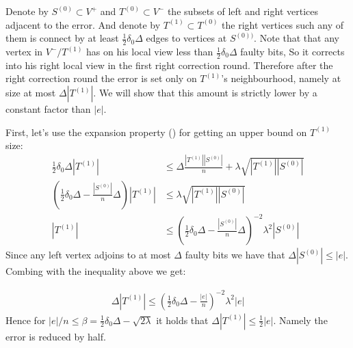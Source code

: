 \documentclass{beamer}
\begin{document}
\begin{frame}

  Denote by $S^{(0)} \subset V^{+}$ and  $T^{(0)} \subset V^{-}$ the subsets of left and right vertices adjacent to the error. And denote by $T^{(1)} \subset T^{(0)}$ the right vertices such any of them is connect by at least $\frac{1}{2}\delta_{0}\Delta$ edges to vertices at $S^{(0))}$. Note that that any vertex in $V^{-}/T^{(1)}$ has on his local view less than $\frac{1}{2}\delta_{0}\Delta$ faulty bits, So it corrects into his right local view in the first right correction round. Therefore after the right correction round the error is set only on $T^{(1)}$'s neighbourhood, namely at size at most $\Delta|T^{(1)}|$.  We will show that this amount is strictly lower by a constant factor than $|e|$. 

\end{frame}
\begin{frame}

  First, let's use the expansion property () for getting an upper bound on $T^{(1)}$ size: \begin{equation*}
  \begin{split} 
    \frac{1}{2}\delta_{0}\Delta |T^{(1)}| & \le \Delta \frac{|T^{(1)}||S^{(0)}|}{n} + \lambda\sqrt{|T^{(1)}||S^{(0)}|} \\ 
  \left( \frac{1}{2} \delta_{0} \Delta - \frac{|S^{(0)}|}{n} \Delta \right) |T^{(1)}| & \le \lambda \sqrt{|T^{(1)}||S^{(0)}|} \\ 
|T^{(1)}| & \le \left( \frac{1}{2} \delta_{0} \Delta - \frac{|S^{(0)}|}{n} \Delta \right)^{-2}\lambda^{2} |S^{(0)}| 
  \end{split}
\end{equation*}
Since any left vertex adjoins to at most $\Delta$ faulty bits we have that $\Delta|S^{(0)}| \le |e|$. Combing with the inequality above we get:  

\begin{equation*}
  \begin{split}
    \Delta |T^{(1)}| \le \left( \frac{1}{2} \delta_{0} \Delta - \frac{|e|}{n} \right)^{-2}\lambda^{2} |e|
  \end{split}
\end{equation*}
Hence for $|e|/n \le \beta =  \frac{1}{2} \delta_{0} \Delta - \sqrt{2\lambda}$ it holds that $\Delta|T^{(1)}| \le \frac{1}{2}|e|$. Namely the error is reduced by half.  




\end{frame}
\end{document}
